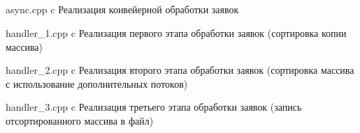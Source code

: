 \begin{appendices}
	\chapter{}
	{async.cpp} %
	{c} %
	{Реализация конвейерной обработки заявок} %
	
	{handler_1.cpp} %
	{c} %
	{Реализация первого этапа обработки заявок (сортировка копии массива)} %
	
	{handler_2.cpp} %
	{c} %
	{Реализация второго этапа обработки заявок (сортировка массива с использование дополнительных потоков)} %
	
	{handler_3.cpp} %
	{c} %
	{Реализация третьего этапа обработки заявок (запись отсортированного массива в файл)} %
	
	
\end{appendices}
	
	
	